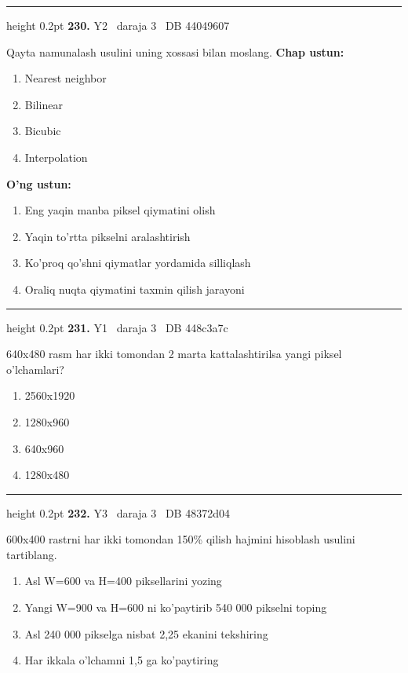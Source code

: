 \documentclass[10pt,a4paper,oneside]{article}
\begin{document}
\vspace{2mm}\hrule height 0.2pt \vspace{4mm}
\hypertarget{q230}{\textbf{\color{ink}230.}}  {\color{muted}\scriptsize Y2 \textbullet\ daraja 3 \textbullet\ DB 44049607}
\par
Qayta namunalash usulini uning xossasi bilan moslang.
\textbf{\footnotesize Chap ustun:}
\begin{enumerate}[label=\arabic*),leftmargin=9mm]
\item Nearest neighbor
\item Bilinear
\item Bicubic
\item Interpolation
\end{enumerate}
\textbf{\footnotesize O'ng ustun:}
\begin{enumerate}[label=\Alph*),leftmargin=9mm]
\item Eng yaqin manba piksel qiymatini olish
\item Yaqin to'rtta pikselni aralashtirish
\item Ko'proq qo'shni qiymatlar yordamida silliqlash
\item Oraliq nuqta qiymatini taxmin qilish jarayoni
\end{enumerate}
\vspace{2mm}\hrule height 0.2pt \vspace{4mm}
\hypertarget{q231}{\textbf{\color{ink}231.}}  {\color{muted}\scriptsize Y1 \textbullet\ daraja 3 \textbullet\ DB 448c3a7c}
\par
640x480 rasm har ikki tomondan 2 marta kattalashtirilsa yangi piksel o'lchamlari?
\begin{enumerate}[label=\Alph*),leftmargin=9mm]
\item 2560x1920
\item 1280x960
\item 640x960
\item 1280x480
\end{enumerate}
\vspace{2mm}\hrule height 0.2pt \vspace{4mm}
\hypertarget{q232}{\textbf{\color{ink}232.}}  {\color{muted}\scriptsize Y3 \textbullet\ daraja 3 \textbullet\ DB 48372d04}
\par
600x400 rastrni har ikki tomondan 150\% qilish hajmini hisoblash usulini tartiblang.
\begin{enumerate}[label=\Alph*),leftmargin=9mm]
\item Asl W=600 va H=400 piksellarini yozing
\item Yangi W=900 va H=600 ni ko'paytirib 540 000 pikselni toping
\item Asl 240 000 pikselga nisbat 2,25 ekanini tekshiring
\item Har ikkala o'lchamni 1,5 ga ko'paytiring
\end{enumerate}
\end{document}
